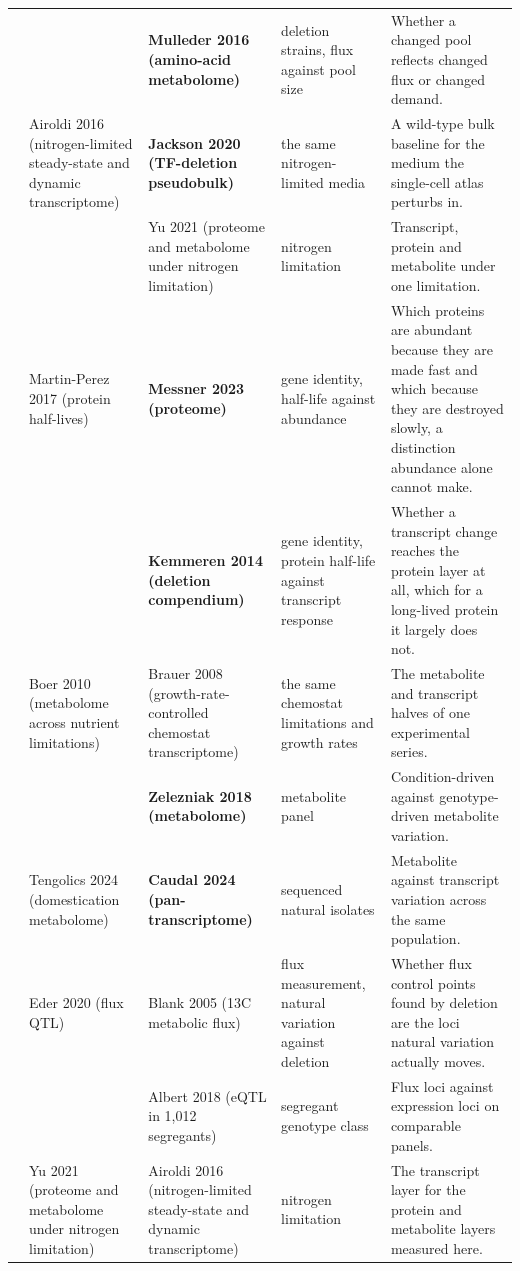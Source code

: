 \begin{landscape}
\begin{longtable}{@{}r@{\hspace{4pt}} L{42mm} L{44mm} L{48mm} L{96mm}@{}}
 &  & \textbf{Mulleder 2016 (amino-acid metabolome)} & deletion strains, flux against pool size & Whether a changed pool reflects changed flux or changed demand. \\
 & Airoldi 2016 (nitrogen-limited steady-state and dynamic transcriptome) & \textbf{Jackson 2020 (TF-deletion pseudobulk)} & the same nitrogen-limited media & A wild-type bulk baseline for the medium the single-cell atlas perturbs in. \\
 &  & Yu 2021 (proteome and metabolome under nitrogen limitation) & nitrogen limitation & Transcript, protein and metabolite under one limitation. \\
 & Martin-Perez 2017 (protein half-lives) & \textbf{Messner 2023 (proteome)} & gene identity, half-life against abundance & Which proteins are abundant because they are made fast and which because they are destroyed slowly, a distinction abundance alone cannot make. \\
 &  & \textbf{Kemmeren 2014 (deletion compendium)} & gene identity, protein half-life against transcript response & Whether a transcript change reaches the protein layer at all, which for a long-lived protein it largely does not. \\
 & Boer 2010 (metabolome across nutrient limitations) & Brauer 2008 (growth-rate-controlled chemostat transcriptome) & the same chemostat limitations and growth rates & The metabolite and transcript halves of one experimental series. \\
 &  & \textbf{Zelezniak 2018 (metabolome)} & metabolite panel & Condition-driven against genotype-driven metabolite variation. \\
 & Tengolics 2024 (domestication metabolome) & \textbf{Caudal 2024 (pan-transcriptome)} & sequenced natural isolates & Metabolite against transcript variation across the same population. \\
 & Eder 2020 (flux QTL) & Blank 2005 (13C metabolic flux) & flux measurement, natural variation against deletion & Whether flux control points found by deletion are the loci natural variation actually moves. \\
 &  & Albert 2018 (eQTL in 1,012 segregants) & segregant genotype class & Flux loci against expression loci on comparable panels. \\
 & Yu 2021 (proteome and metabolome under nitrogen limitation) & Airoldi 2016 (nitrogen-limited steady-state and dynamic transcriptome) & nitrogen limitation & The transcript layer for the protein and metabolite layers measured here. \\

\end{longtable}
\end{landscape}
